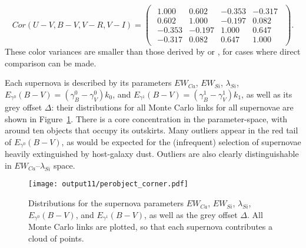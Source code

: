 \documentclass{aastex61}   	%
\begin{document}
 \begin{equation}
 Cor(U-V, B-V, V-R, V-I)=
\begin{pmatrix}
\begin{array}{rrrr}
1.000 & 0.602 & -0.353 & -0.317 \\
0.602 & 1.000 & -0.197 & 0.082 \\
-0.353 & -0.197 & 1.000 & 0.647 \\
-0.317 & 0.082 & 0.647 & 1.000
\end{array}
\end{pmatrix}.
  \label{color_cor:eqn}
 \end{equation}
These color variances are smaller than those derived by \citet{2003A&A...404..901N} or \citet{2007ApJ...659..122J}, for cases where direct comparison can be made.

Each supernova is described by its parameters $EW_{Ca}$, $EW_{Si}$, $\lambda_{Si}$, $E_{\gamma^0}(B-V)=(\gamma^0_B-\gamma^0_V)k_0$, and
$E_{\gamma^1}(B-V)=(\gamma^1_B-\gamma^1_V)k_1$, as well as its grey offset
$\Delta$: their distributions for all Monte Carlo links for all supernovae are shown in Figure~\ref{perobject:fig}.
There is a core concentration in the  parameter-space, with around ten objects that occupy its outskirts.
Many outliers appear in the red tail of $E_{\gamma^0}(B-V)$, as would be expected for the (infrequent) selection of supernovae
heavily extinguished by host-galaxy dust.
Outliers  are also clearly distinguishable in  $EW_{Ca}$--$\lambda_{Si}$ space.   

\begin{figure}[htbp] %
   \centering
   \texttt{[image: output11/perobject\_corner.pdf]} 
   \caption{Distributions for the supernova parameters $EW_{Ca}$, $EW_{Si}$, $\lambda_{Si}$, $E_{\gamma^0}(B-V)$, and $E_{\gamma^1}(B-V)$, as well as the grey offset
$\Delta$.  All Monte Carlo links are plotted, so that each supernova contributes a cloud of points.
   \label{perobject:fig}}
\end{figure}
\end{document}
